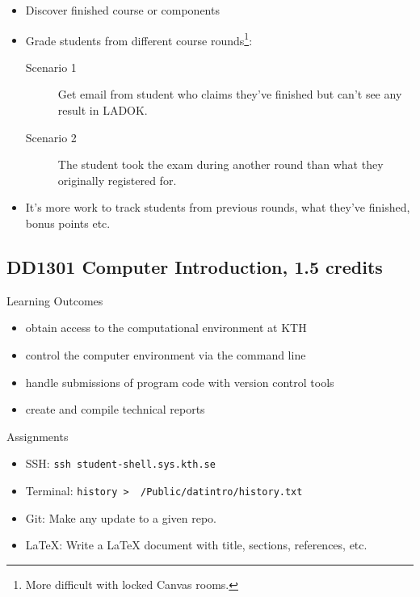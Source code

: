 \begin{frame}
  \begin{example}
    \begin{itemize}
      \item \alert<1>{Discover finished course or components}
      \item \alert<1-2>{Grade students from different course rounds}\footnote{%
          More difficult with locked Canvas rooms.
        }:
        \begin{description}
          \item[Scenario 1] \alert<1>{Get email from student who claims they've 
            finished but can't see any result in LADOK.}

          \item[Scenario 2] The student took the exam during another round than 
            what they originally registered for.
        \end{description}

      \item \alert<1>{It's more work to track students from previous rounds, 
        what they've finished, bonus points etc.}
    \end{itemize}
  \end{example}
\end{frame}

\subsection{DD1301 Computer Introduction, 1.5 credits}

\begin{frame}[fragile]
  \begin{block}{Learning Outcomes}
    \begin{itemize}
      \item<1> obtain access to the computational environment at KTH
      \item<2> control the computer environment via the command line
      \item<3> handle submissions of program code with version control tools
      \item<4> create and compile technical reports
    \end{itemize}
  \end{block}

  \begin{block}{Assignments}
    \begin{itemize}
      \item<1> SSH: \texttt{ssh student-shell.sys.kth.se}
      \item<2> Terminal: \texttt{history > ~/Public/datintro/history.txt}
      \item<3> Git: Make any update to a given repo.
      \item<4> LaTeX: Write a LaTeX document with title, sections, references, 
        etc.
    \end{itemize}
  \end{block}
\end{frame}

